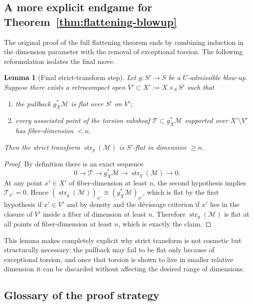\documentclass[11pt,oneside]{article}
\newtheorem{lemma}[theorem]{Lemma}
\newcommand{\M}{\mathcal M}
\newcommand{\Tcal}{\mathcal T}
\newcommand{\st}{\operatorname{str}}
\begin{document}
\subsection{A more explicit endgame for Theorem~\texorpdfstring{\ref{thm:flattening-blowup}}{}}

The original proof of the full flattening theorem ends by combining induction in the dimension parameter with the removal of exceptional torsion.  The following reformulation isolates the final move.

\begin{lemma}[Final strict-transform step]\label{lem:strict-endgame}
Let $g\colon S'\to S$ be a $U$-admissible blow-up.  Suppose there exists a retrocompact open $V'\subset X':=X\times_S S'$ such that
\begin{enumerate}[label=\textup{(\roman*)}]
  \item the pullback $g_X^*\M$ is flat over $S'$ on $V'$;
  \item every associated point of the torsion subsheaf $\Tcal\subset g_X^*\M$ supported over $X'\setminus V'$ has fiber-dimension $<n$.
\end{enumerate}
Then the strict transform $\st_g(\M)$ is $S'$-flat in dimension $\ge n$.
\end{lemma}

\begin{proof}
By definition there is an exact sequence
\[
0\to \Tcal\to g_X^*\M\to \st_g(\M)\to 0.
\]
At any point $x'\in X'$ of fiber-dimension at least $n$, the second hypothesis implies $\Tcal_{x'}=0$.  Hence $(\st_g(\M))_{x'}\cong (g_X^*\M)_{x'}$, which is flat by the first hypothesis if $x'\in V'$ and by density and the d\'evissage criterion if $x'$ lies in the closure of $V'$ inside a fiber of dimension at least $n$.  Therefore $\st_g(\M)$ is flat at all points of fiber-dimension at least $n$, which is exactly the claim.
\end{proof}

This lemma makes completely explicit why strict transform is not cosmetic but structurally necessary: the pullback may fail to be flat only because of exceptional torsion, and once that torsion is shown to live in smaller relative dimension it can be discarded without affecting the desired range of dimensions.

\subsection{Glossary of the proof strategy}
\end{document}
